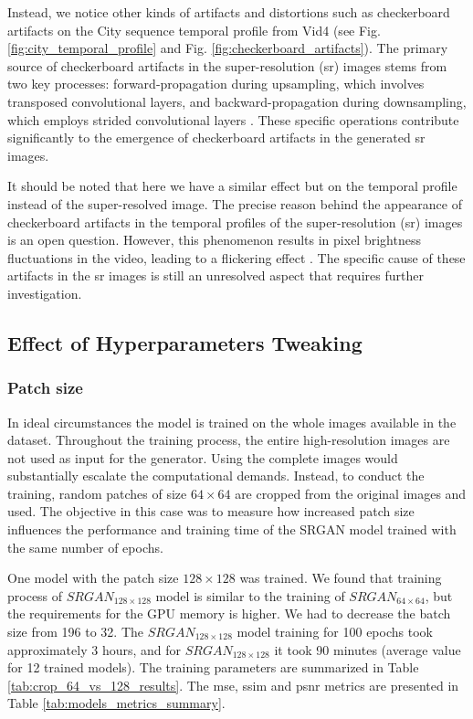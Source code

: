 \documentclass[conference]{IEEEtran}
\begin{document}
Instead, we notice other kinds of artifacts and distortions such as checkerboard artifacts on the City sequence temporal profile from Vid4 (see Fig. \ref{fig:city_temporal_profile} and Fig. \ref{fig:checkerboard_artifacts}). The primary source of checkerboard artifacts in the super-resolution (\acrshort{sr}) images stems from two key processes: forward-propagation during upsampling, which involves transposed convolutional layers, and backward-propagation during downsampling, which employs strided convolutional layers \cite{checkerboard_2020}. These specific operations contribute significantly to the emergence of checkerboard artifacts in the generated \acrshort{sr} images.

It should be noted that here we have a similar effect but on the temporal profile instead of the super-resolved image. The precise reason behind the appearance of checkerboard artifacts in the temporal profiles of the super-resolution (\acrshort{sr}) images is an open question. However, this phenomenon results in pixel brightness fluctuations in the video, leading to a flickering effect \cite{frvsr_2018}. The specific cause of these artifacts in the \acrshort{sr} images is still an unresolved aspect that requires further investigation.

\subsection{Effect of Hyperparameters Tweaking}

\subsubsection{Patch size}

In ideal circumstances the model is trained on the whole images available in the dataset. Throughout the training process, the entire high-resolution images are not used as input for the generator. Using the complete images would substantially escalate the computational demands. Instead, to conduct the training, random patches of size $64 \times 64$ are cropped from the original images and used. The objective in this case was to measure how increased patch size influences the performance and training time of the SRGAN model trained with the same number of epochs.

One model with the patch size $128 \times 128$ was trained. We found that training process of $SRGAN_{128 \times 128}$ model is similar to the training of $SRGAN_{64 \times 64}$, but the requirements for the GPU memory is higher. We had to decrease the batch size from 196 to 32. The  $SRGAN_{128 \times 128}$ model training for 100 epochs took approximately 3 hours, and for $SRGAN_{128 \times 128}$  it took 90 minutes (average value for 12 trained models). The training parameters are summarized in Table \ref{tab:crop_64_vs_128_results}. The \acrshort{mse}, \acrshort{ssim} and \acrshort{psnr} metrics are presented in Table \ref{tab:models_metrics_summary}.
\end{document}
